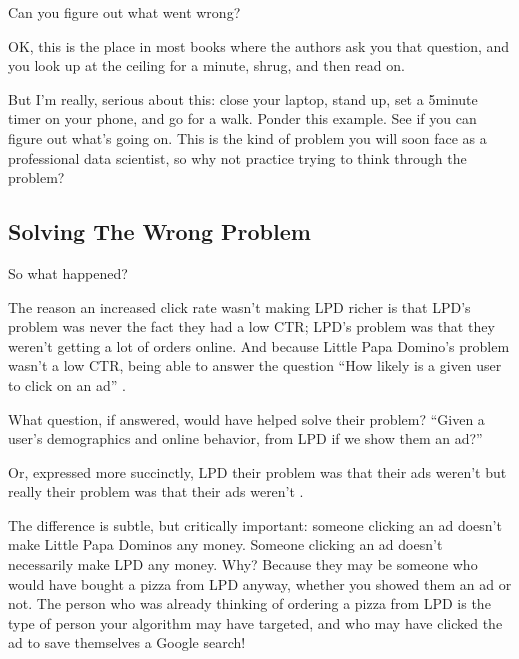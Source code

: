 \documentclass[letterpaper,10pt,english]{jupyterBook}
\begin{document}
\sphinxAtStartPar
Can you figure out what went wrong?

\sphinxAtStartPar
OK, this is the place in most books where the authors ask you that question, and you look up at the ceiling for a minute, shrug, and then read on.

\sphinxAtStartPar
But I’m really,  serious about this: close your laptop, stand up, set a 5\sphinxhyphen{}minute timer on your phone, and go for a walk. Ponder this example. See if you can figure out what’s going on. This is  the kind of problem you will soon face as a professional data scientist, so why not practice trying to think through the problem?


\subsection{Solving The Wrong Problem}
\label{\detokenize{10_introduction/30_solving_the_right_problem:solving-the-wrong-problem}}
\sphinxAtStartPar
So what happened?

\sphinxAtStartPar
The reason an increased click rate wasn’t making LPD richer is that LPD’s problem was never the fact they had a low CTR; LPD’s  problem was that they weren’t getting a lot of orders online. And because Little Papa Domino’s problem wasn’t a low CTR, being able to answer the question “How likely is a given user to click on an ad” .

\sphinxAtStartPar
What question, if answered, would have helped solve their problem? “Given a user’s demographics and online behavior,  from LPD if we show them an ad?”

\sphinxAtStartPar
Or, expressed more succinctly, LPD  their problem was that their ads weren’t  but really their problem was that their ads weren’t .

\sphinxAtStartPar
The difference is subtle, but critically important: someone clicking an ad doesn’t make Little Papa Dominos any money. Someone clicking an ad  doesn’t necessarily make LPD any money. Why? Because they may be someone who would have bought a pizza from LPD anyway, whether you showed them an ad or not. The person who was already thinking of ordering a pizza from LPD is  the type of person your algorithm may have targeted, and who may have clicked the ad to save themselves a Google search!
\end{document}
